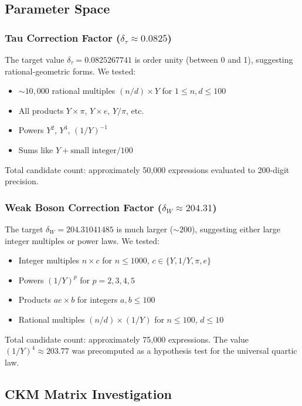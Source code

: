 \documentclass[11pt,a4paper]{article}
\begin{document}
\subsection{Parameter Space}

\subsubsection{Tau Correction Factor ($\delta_\tau \approx 0.0825$)}

The target value $\delta_\tau = 0.0825267741$ is order unity (between 0 and 1), suggesting rational-geometric forms. We tested:
\begin{itemize}
\item $\sim 10{,}000$ rational multiples $(n/d) \times Y$ for $1 \le n, d \le 100$
\item All products $Y \times \pi$, $Y \times e$, $Y / \pi$, etc.
\item Powers $Y^2$, $Y^3$, $(1/Y)^{-1}$
\item Sums like $Y + \text{small integer}/100$
\end{itemize}
Total candidate count: approximately 50,000 expressions evaluated to 200-digit precision.

\subsubsection{Weak Boson Correction Factor ($\delta_W \approx 204.31$)}

The target $\delta_W = 204.31041485$ is much larger ($\sim 200$), suggesting either large integer multiples or power laws. We tested:
\begin{itemize}
\item Integer multiples $n \times c$ for $n \le 1000$, $c \in \{Y, 1/Y, \pi, e\}$
\item Powers $(1/Y)^p$ for $p = 2, 3, 4, 5$
\item Products $a e \times b$ for integers $a, b \le 100$
\item Rational multiples $(n/d) \times (1/Y)$ for $n \le 100$, $d \le 10$
\end{itemize}
Total candidate count: approximately 75,000 expressions. The value $(1/Y)^4 \approx 203.77$ was precomputed as a hypothesis test for the universal quartic law.

\subsection{CKM Matrix Investigation}
\end{document}
